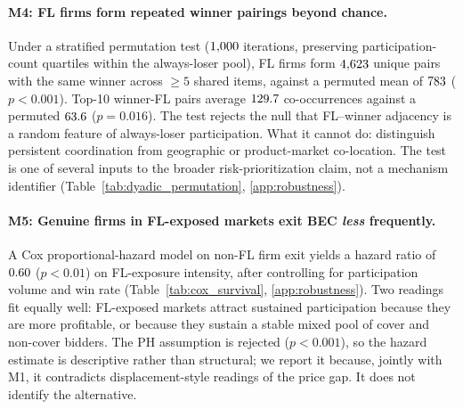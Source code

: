 \paragraph{M4: FL firms form repeated winner pairings beyond
chance.} Under a stratified permutation test ($1{,}000$
iterations, preserving participation-count quartiles within
the always-loser pool), FL firms form $4{,}623$ unique pairs
with the same winner across $\geq 5$ shared items, against a
permuted mean of $783$ ($p < 0.001$). Top-10 winner-FL
pairs average $129.7$ co-occurrences against a permuted $63.6$
($p = 0.016$). The test rejects the null that FL--winner
adjacency is a random feature of always-loser participation.
What it cannot do: distinguish persistent coordination from
geographic or product-market co-location. The test is one of
several inputs to the broader risk-prioritization claim, not a
mechanism identifier
(Table~\ref{tab:dyadic_permutation}, \ref{app:robustness}).

\paragraph{M5: Genuine firms in FL-exposed markets exit BEC
\emph{less} frequently.} A Cox proportional-hazard model on
non-FL firm exit yields a hazard ratio of $0.60$ ($p < 0.01$)
on FL-exposure intensity, after controlling for participation
volume and win rate
(Table~\ref{tab:cox_survival}, \ref{app:robustness}). Two
readings fit equally well: FL-exposed markets attract
sustained participation because they are more profitable, or
because they sustain a stable mixed pool of cover and
non-cover bidders. The PH assumption is rejected
($p < 0.001$), so the hazard estimate is descriptive rather
than structural; we report it because, jointly with M1, it
contradicts displacement-style readings of the price gap. It
does not identify the alternative.

